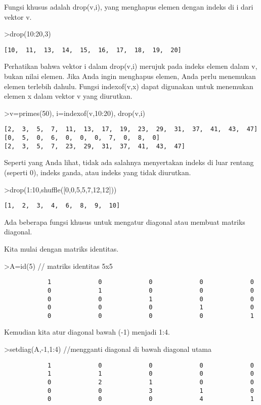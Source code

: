 \documentclass[
]{book}
\begin{document}
Fungsi khusus adalah drop(v,i), yang menghapus elemen dengan indeks di i dari vektor v.

\textgreater drop(10:20,3)

\begin{verbatim}
[10,  11,  13,  14,  15,  16,  17,  18,  19,  20]
\end{verbatim}

Perhatikan bahwa vektor i dalam drop(v,i) merujuk pada indeks elemen dalam v, bukan nilai elemen. Jika Anda ingin menghapus elemen, Anda perlu menemukan elemen terlebih dahulu. Fungsi indexof(v,x) dapat digunakan untuk menemukan elemen x dalam vektor v yang diurutkan.

\textgreater v=primes(50), i=indexof(v,10:20), drop(v,i)

\begin{verbatim}
[2,  3,  5,  7,  11,  13,  17,  19,  23,  29,  31,  37,  41,  43,  47]
[0,  5,  0,  6,  0,  0,  0,  7,  0,  8,  0]
[2,  3,  5,  7,  23,  29,  31,  37,  41,  43,  47]
\end{verbatim}

Seperti yang Anda lihat, tidak ada salahnya menyertakan indeks di luar rentang (seperti 0), indeks ganda, atau indeks yang tidak diurutkan.

\textgreater drop(1:10,shuffle({[}0,0,5,5,7,12,12{]}))

\begin{verbatim}
[1,  2,  3,  4,  6,  8,  9,  10]
\end{verbatim}

Ada beberapa fungsi khusus untuk mengatur diagonal atau membuat matriks diagonal.

Kita mulai dengan matriks identitas.

\textgreater A=id(5) // matriks identitas 5x5

\begin{verbatim}
            1             0             0             0             0 
            0             1             0             0             0 
            0             0             1             0             0 
            0             0             0             1             0 
            0             0             0             0             1 
\end{verbatim}

Kemudian kita atur diagonal bawah (-1) menjadi 1:4.

\textgreater setdiag(A,-1,1:4) //mengganti diagonal di bawah diagonal utama

\begin{verbatim}
            1             0             0             0             0 
            1             1             0             0             0 
            0             2             1             0             0 
            0             0             3             1             0 
            0             0             0             4             1 
\end{verbatim}
\end{document}
